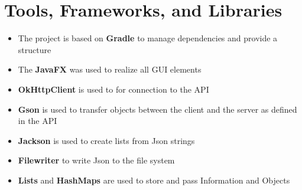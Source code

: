 \section{Tools, Frameworks, and Libraries}
\begin{itemize}
    \item The project is based on \textbf{Gradle} to manage dependencies and provide a structure
    \item The \textbf{JavaFX} was used to realize all GUI elements
    \item \textbf{OkHttpClient} is used to for connection to the API
    \item \textbf{Gson} is used to transfer objects between the client and the server as defined in the API
    \item \textbf{Jackson} is used to create lists from Json strings
    \item \textbf{Filewriter} to write Json to the file system
    \item \textbf{Lists} and \textbf{HashMaps} are used to store and pass Information and Objects
\end{itemize}